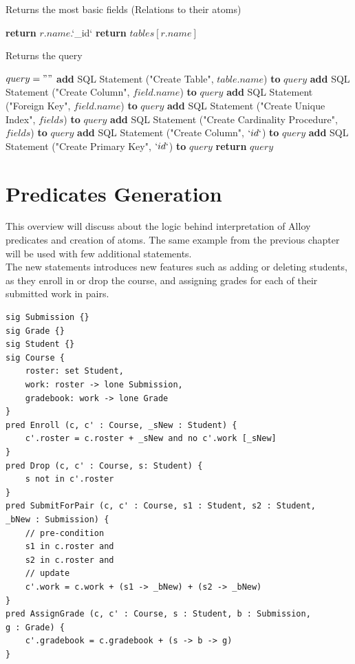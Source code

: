 \documentclass[oneside]{book}
\begin{document}
\begin{algorithm}
\caption{Returns the most basic fields (Relations to their atoms)}
\label{array-sum1}
\begin{algorithmic}[1]
				\State \textbf{return} $r.name$.`\_id`
			\EndIf
			\State \textbf{return} $tables[r.name]$
\EndFunction
\end{algorithmic}
\end{algorithm}

\begin{algorithm}
\caption{Returns the query}
\label{array-sum1}
\begin{algorithmic}[1]
	\State $query = ""$
		\State \textbf{add} SQL Statement ("Create Table", $table.name$) \textbf{to} $query$
			\State \textbf{add} SQL Statement ("Create Column", $field.name$) \textbf{to} $query$
			\State \textbf{add} SQL Statement ("Foreign Key", $field.name$) \textbf{to} $query$
			 \State \textbf{add} SQL Statement ("Create Unique Index", $fields$) \textbf{to} $query$
			\EndIf
			 \State \textbf{add} SQL Statement ("Create Cardinality Procedure", $fields$) \textbf{to} $query$
			\EndIf
		\EndFor
		\State \textbf{add} SQL Statement ("Create Column", $`id`$) \textbf{to} $query$
		\State \textbf{add} SQL Statement ("Create Primary Key", $`id`$) \textbf{to} $query$
	\EndFor
			\State \textbf{return} $query$
\EndFunction
\end{algorithmic}
\end{algorithm}

\newpage
\section{Predicates Generation}
\label{sec:predicatesgen}
This overview will discuss about the logic behind interpretation of Alloy predicates and creation of atoms. The same example from the previous chapter will be used with few additional statements.\\

\noindent The new statements introduces new features such as adding or deleting students, as they enroll in or drop the course, and assigning grades for each of their submitted work in pairs.\\

\begin{lstlisting}
sig Submission {}
sig Grade {}
sig Student {}
sig Course {
	roster: set Student,
	work: roster -> lone Submission,
	gradebook: work -> lone Grade
}
pred Enroll (c, c' : Course, _sNew : Student) {
	c'.roster = c.roster + _sNew and no c'.work [_sNew]
}
pred Drop (c, c' : Course, s: Student) {
	s not in c'.roster 
}
pred SubmitForPair (c, c' : Course, s1 : Student, s2 : Student, 
_bNew : Submission) {
	// pre-condition
	s1 in c.roster and
	s2 in c.roster and
	// update
	c'.work = c.work + (s1 -> _bNew) + (s2 -> _bNew)
}
pred AssignGrade (c, c' : Course, s : Student, b : Submission, 
g : Grade) {
	c'.gradebook = c.gradebook + (s -> b -> g)
}
\end{lstlisting}
\end{document}
